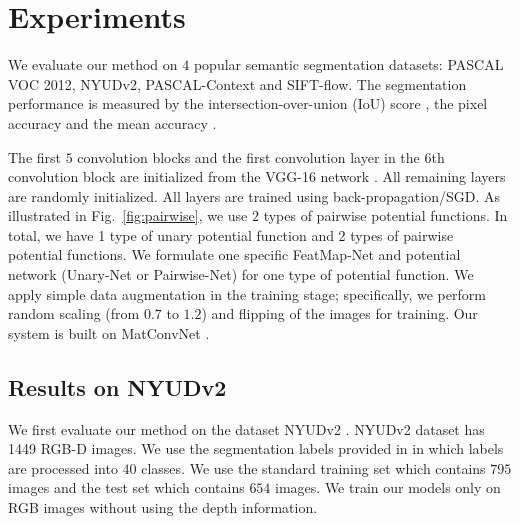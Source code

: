 





%
%
%
%
%
%
%
%
%
%
%
%
%
%
%
%
%
%
%





%
%
%
%
%
%
%
%
%
%
%
%
%
%
%
%
%
%
%









\section{Experiments}

We evaluate our method on $4$ popular semantic segmentation datasets: PASCAL VOC 2012, NYUDv2, PASCAL-Context and SIFT-flow.
The segmentation performance is measured by the intersection-over-union (IoU) score \cite{everingham2010pascal}, the pixel accuracy and the mean accuracy \cite{LongSD14}.

The first $5$ convolution blocks and the first convolution layer in the $6$th convolution block are initialized from the VGG-16 network \cite{simonyan2014very}.
All remaining layers are randomly initialized. All layers are trained using back-propagation/SGD.
As illustrated in Fig.~\ref{fig:pairwise},
we use $2$ types of pairwise potential functions.
In total, we have 1 type of unary potential function and 2 types of pairwise potential functions.
We formulate one specific FeatMap-Net and potential network (Unary-Net or Pairwise-Net) for one type of potential
function. 
We apply simple data augmentation in the training stage;
specifically, we perform random scaling (from $0.7$ to $1.2$) and flipping of the images for training.
Our system is built on MatConvNet \cite{matconvnet}.






\subsection{Results on NYUDv2}

We first evaluate our method on the dataset NYUDv2 \cite{silberman2012indoor}.
NYUDv2 dataset has 1449 RGB-D images. We use the segmentation labels provided in \cite{gupta2013perceptual} in which labels are processed into $40$ classes.
We use the standard training set which contains $795$ images and the test set which contains $654$ images.
We train our models only on RGB images without using the depth information.

